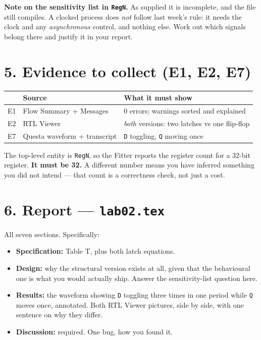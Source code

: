 \documentclass[11pt]{article}
\newcommand{\code}[1]{\texttt{#1}}
\begin{document}
\textbf{Note on the sensitivity list in \code{RegN}.} As supplied it is
incomplete, and the file still compiles. A clocked process does \emph{not} follow
last week's rule: it needs the clock and any \emph{asynchronous} control, and
nothing else. Work out which signals belong there and justify it in your report.

\section*{5. Evidence to collect (E1, E2, E7)}

\begin{center}
\begin{tabular}{lll}
\toprule
& Source & What it must show \\
\midrule
E1 & Flow Summary + Messages & 0 errors; warnings sorted and explained \\
E2 & RTL Viewer & \emph{both} versions: two latches vs one flip-flop \\
E7 & Questa waveform + transcript & \code{D} toggling, \code{Q} moving once \\
\bottomrule
\end{tabular}
\end{center}

The top-level entity is \code{RegN}, so the Fitter reports the register count for
a 32-bit register. \textbf{It must be 32.} A different number means you have
inferred something you did not intend --- that count is a correctness check, not
just a cost.

\section*{6. Report --- \code{lab02.tex}}

All seven sections. Specifically:

\begin{itemize}[leftmargin=1.6em,itemsep=1pt]
\item \textbf{Specification:} Table T, plus both latch equations.
\item \textbf{Design:} why the structural version exists at all, given that the
behavioural one is what you would actually ship. Answer the sensitivity-list
question here.
\item \textbf{Results:} the waveform showing \code{D} toggling three times in one
period while \code{Q} moves once, annotated. Both RTL Viewer pictures, side by
side, with one sentence on why they differ.
\item \textbf{Discussion:} required. One bug, how you found it.
\end{itemize}
\end{document}
